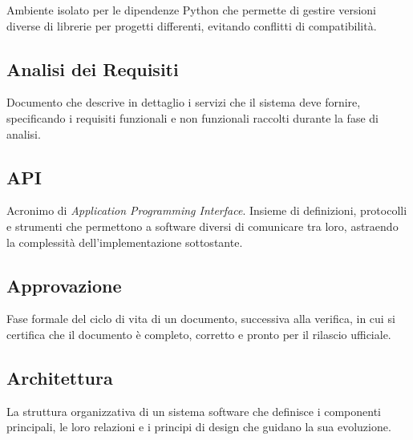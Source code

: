 \documentclass[a4paper, 11pt, oneside]{scrartcl} %
\begin{document}
Ambiente isolato per le dipendenze Python che permette di gestire versioni diverse di librerie per progetti differenti, evitando conflitti di compatibilità.

\vspace{0.5cm}

\subsection*{Analisi dei Requisiti}


Documento che descrive in dettaglio i servizi che il sistema deve fornire, specificando i requisiti funzionali e non funzionali raccolti durante la fase di analisi.

\vspace{0.5cm}

\subsection*{API}
Acronimo di \textit{Application Programming Interface}. Insieme di definizioni, protocolli e strumenti che permettono a software diversi di comunicare tra loro, astraendo la complessità dell'implementazione sottostante.
\vspace{0.5cm}

\subsection*{Approvazione}


Fase formale del ciclo di vita di un documento, successiva alla verifica, in cui si certifica che il documento è completo, corretto e pronto per il rilascio ufficiale.

\vspace{0.5cm}

\subsection*{Architettura}


La struttura organizzativa di un sistema software che definisce i componenti principali, le loro relazioni e i principi di design che guidano la sua evoluzione.
\end{document}

